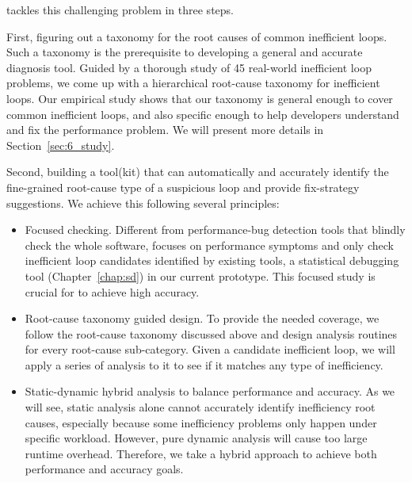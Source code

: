 \Tool tackles this challenging problem in three steps.

First, figuring out a taxonomy for the root causes of common inefficient loops.
Such a taxonomy is the prerequisite to developing a general and accurate
diagnosis tool. Guided by a thorough study of 45 real-world inefficient
loop problems, we come up with a hierarchical root-cause taxonomy for
inefficient loops. 
Our empirical study shows that our taxonomy is general enough to cover
common inefficient loops, and also specific enough to help developers understand
and fix the performance problem. We will present more details 
in Section~\ref{sec:6_study}.
 
Second, building a tool(kit) \Tool that can automatically and accurately
identify the fine-grained root-cause type of a suspicious loop 
and provide fix-strategy suggestions. 
We achieve this following several principles:

\begin{itemize}
\item Focused checking. 
Different from performance-bug detection tools that blindly check the whole
software, \Tool focuses on performance symptoms and only check inefficient
loop candidates identified by existing tools, a statistical debugging
tool (Chapter~\ref{chap:sd}) in our current prototype. 
This focused study is crucial for \Tool to achieve high
accuracy.

\item Root-cause taxonomy guided design. To provide the needed coverage, we follow
the root-cause taxonomy discussed above and design analysis routines for 
every root-cause sub-category. Given a candidate inefficient loop, we will 
apply a series of analysis to it to see if it matches any type of inefficiency.

\item Static-dynamic hybrid analysis to balance performance and accuracy.
As we will see, static analysis alone cannot accurately identify 
inefficiency root causes, especially because some inefficiency problems only
happen under specific workload. However, pure dynamic analysis will 
cause too large 
runtime overhead. Therefore, we take a hybrid approach to achieve both
performance and accuracy goals.
\end{itemize}

